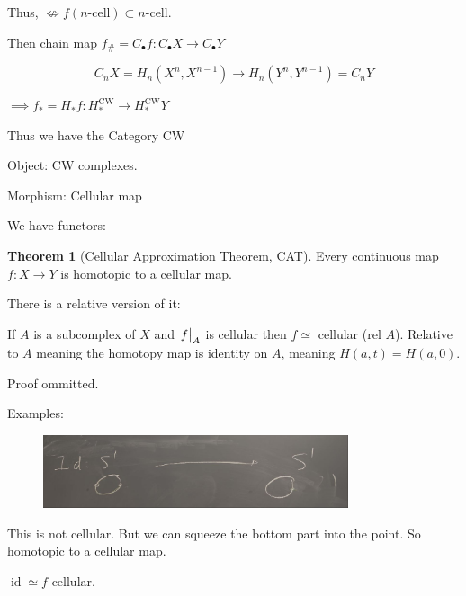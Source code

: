 \documentclass{article}
\theoremstyle{definition}
\newtheorem{theorem}{Theorem}
\begin{document}
    Thus, \(\not\iff f(n\text{-cell}) \subset n\text{-cell}\).
    
    Then chain map \(f_\# = C_\bullet f: C_\bullet X \to C_\bullet Y\)
    
    \[
        C_n X = H_n(X^n, X^{n-1}) \to H_n(Y^n, Y^{n-1}) = C_n Y
    \]

    \(\implies f_{\ast} =H_{\ast} f: H_{\ast}^{\text{CW}} \to H_{\ast}^{\text{CW}} Y\) 

    Thus we have the Category CW

    Object: CW complexes.

    Morphism: Cellular map

    We have functors:

    \begin{center}
    \end{center}

    \begin{theorem}
        [Cellular Approximation Theorem, CAT] Every continuous map \(f: X \to Y\) is homotopic to a cellular map.
    \end{theorem}

    There is a relative version of it:

    If \(A\) is a subcomplex of \(X\) and \(\eval{f}_A\) is cellular then \(f\simeq\) cellular (rel \(A\)). Relative to \(A\) meaning the homotopy map is identity on \(A\), meaning \(H(a,t)=H(a,0)\).

    Proof ommitted.

    Examples:

    \begin{figure}[H]
        \centering
        \includegraphics[width=0.8\textwidth]{img/cellexample}
    \end{figure}    

    This is not cellular. But we can squeeze the bottom part into the point. So homotopic to a cellular map.

    \(\operatorname{id} \simeq f\) cellular.
\end{document}
